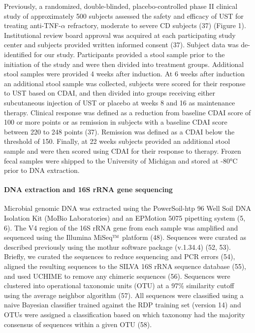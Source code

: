 \documentclass[12pt,]{article}
\let\oldparagraph\paragraph
\renewcommand{\paragraph}[1]{\oldparagraph{#1}\mbox{}}
\begin{document}
Previously, a randomized, double-blinded, placebo-controlled phase II
clinical study of approximately 500 subjects assessed the safety and
efficacy of UST for treating anti-TNF-\({\alpha}\) refractory, moderate
to severe CD subjects (37) (Figure 1). Institutional review board
approval was acquired at each participating study center and subjects
provided written informed consent (37). Subject data was de-identified
for our study. Participants provided a stool sample prior to the
initiation of the study and were then divided into treatment groups.
Additional stool samples were provided 4 weeks after induction. At 6
weeks after induction an additional stool sample was collected, subjects
were scored for their response to UST based on CDAI, and then divided
into groups receiving either subcutaneous injection of UST or placebo at
weeks 8 and 16 as maintenance therapy. Clinical response was defined as
a reduction from baseline CDAI score of 100 or more points or as
remission in subjects with a baseline CDAI score between 220 to 248
points (37). Remission was defined as a CDAI below the threshold of 150.
Finally, at 22 weeks subjects provided an additional stool sample and
were then scored using CDAI for their response to therapy. Frozen fecal
samples were shipped to the University of Michigan and stored at -80°C
prior to DNA extraction.

\paragraph{DNA extraction and 16S rRNA gene
sequencing}\label{dna-extraction-and-16s-rrna-gene-sequencing}

Microbial genomic DNA was extracted using the PowerSoil-htp 96 Well Soil
DNA Isolation Kit (MoBio Laboratories) and an EPMotion 5075 pipetting
system (5, 6). The V4 region of the 16S rRNA gene from each sample was
amplified and sequenced using the Illumina
MiSeq\(\text{\texttrademark}\) platform (48). Sequences were curated as
described previously using the mothur software package (v.1.34.4) (52,
53). Briefly, we curated the sequences to reduce sequencing and PCR
errors (54), aligned the resulting sequences to the SILVA 16S rRNA
sequence database (55), and used UCHIME to remove any chimeric sequences
(56). Sequences were clustered into operational taxonomic units (OTU) at
a 97\% similarity cutoff using the average neighbor algorithm (57). All
sequences were classified using a naive Bayesian classifier trained
against the RDP training set (version 14) and OTUs were assigned a
classification based on which taxonomy had the majority consensus of
sequences within a given OTU (58).
\end{document}

